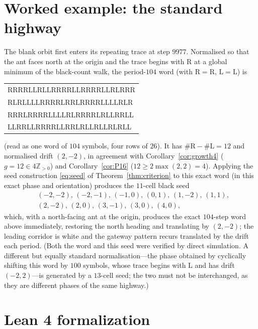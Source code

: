\documentclass[11pt,letterpaper]{article}
\theoremstyle{plain}
\theoremstyle{definition}
\newcommand{\Z}{\mathbb{Z}}
\newcommand{\growth}{g}
\newcommand{\turnR}{\mathrm{R}}
\newcommand{\turnL}{\mathrm{L}}
\begin{document}
\begin{NoHyper}
\appendix
\section{Worked example: the standard highway}\label{app:example}

The blank orbit first enters its repeating trace at step $9977$. Normalised so that
the ant faces north at the origin and the trace begins with $\turnR$ at a global
minimum of the black-count walk, the period-$104$ word (with $\turnR=$R, $\turnL=$L)
is
\begin{center}\ttfamily\normalsize
\begin{tabular}{@{}l@{}}
RRRRLLRLLRRRRLLRRRRLLRLRRR\\
RLRLLLLRRRRLRRLRRRRLLLLRLR\\
RRRLRRRRLLLLRLRRRRLRLLRRLL\\
LLRRLLRRRRLLRRLRLLRLLRLRLL
\end{tabular}
\end{center}
(read as one word of $104$ symbols, four rows of $26$). It has
$\#\turnR-\#\turnL=12$ and normalised drift $(2,-2)$, in agreement with
Corollary~\ref{cor:growth4} ($\growth=12\in4\Z_{>0}$) and Corollary~\ref{cor:P16}
($12\ge 2\max(2,2)=4$). Applying the seed construction \eqref{eq:seed} of
Theorem~\ref{thm:criterion} to this exact word (in this exact phase and orientation)
produces the $11$-cell black seed
\[
\begin{aligned}
&(-2,-2),\,(-2,-1),\,(-1,0),\,(0,1),\,(1,-2),\,(1,1),\\
&(2,-2),\,(2,0),\,(3,-1),\,(3,0),\,(4,0),
\end{aligned}
\]
which, with a north-facing ant at the origin, produces the exact $104$-step word
above immediately, restoring the north heading and translating by $(2,-2)$; the
leading corridor is white and the gateway pattern recurs translated by the drift
each period. (Both the word and this seed were verified by direct simulation. A
different but equally standard normalisation---the phase obtained by cyclically
shifting this word by $100$ symbols, whose trace begins with $\turnL$ and has drift
$(-2,2)$---is generated by a $13$-cell seed; the two must not be interchanged, as
they are different phases of the same highway.)

\section{Lean 4 formalization}\label{app:lean}


\end{NoHyper}
\end{document}
